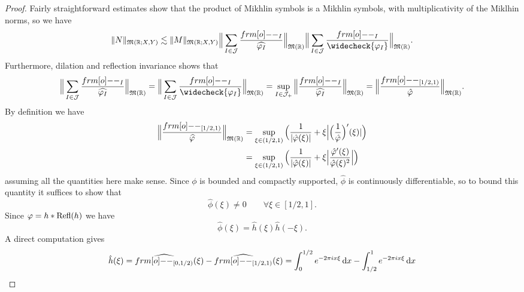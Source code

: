 \begin{proof}
  Fairly straightforward estimates show that the product of Mikhlin symbols is a Mikhlin symbols, with multiplicativity of the Miklhin norms, so we have
  \begin{equation*}
     \|N\|_{\mf{M}(\R;X,Y)} \lesssim \|M\|_{\mf{M}(\R;X,Y)} \Big\| \sum_{I \in \mc{J}} \frac{\1_{I} }{\widehat{\phi_{I}}} \Big\|_{\mf{M}(\R)} \Big\| \sum_{I \in \mc{J}} \frac{\1_{I} }{\widecheck{\phi_{I}}} \Big\|_{\mf{M}(\R)}.
   \end{equation*}
   Furthermore, dilation and reflection invariance shows that
   \begin{equation*}
     \Big\| \sum_{I \in \mc{J}} \frac{\1_{I} }{\widehat{\phi_{I}}} \Big\|_{\mf{M}(\R)}
     = \Big\| \sum_{I \in \mc{J}} \frac{\1_{I} }{\widecheck{\phi_{I}}} \Big\|_{\mf{M}(\R)}
     = \sup_{I \in \mc{J_{+}}} \Big\| \frac{\1_{I}}{\widehat{\phi_{I}}} \Big\|_{\mf{M}(\R)}
     = \Big\| \frac{\1_{[1/2,1)}}{\hat{\phi}} \Big\|_{\mf{M}(\R)}.
   \end{equation*}
   By definition we have
   \begin{equation*}
     \begin{aligned}
       \Big\| \frac{\1_{[1/2,1)}}{\widehat{\phi}} \Big\|_{\mf{M}(\R)}
       &= \sup_{\xi \in (1/2, 1)} \Big( \frac{1}{|\hat{\phi}(\xi)|}  + \xi\Big|\Big(\frac{1}{\hat{\phi}}\Big)'(\xi)| \Big) \\
       &= \sup_{\xi \in (1/2, 1)} \Big( \frac{1}{|\hat{\phi}(\xi)|}  + \xi\Big|\frac{\hat{\phi}'(\xi)}{\hat{\phi}(\xi)^2}\Big| \Big)
   \end{aligned}
   \end{equation*}
   assuming all the quantities here make sense.
   Since $\phi$ is bounded and compactly supported, $\hat{\phi}$ is continuously differentiable, so to bound this quantity it suffices to show that
   \begin{equation}\label{eq:phi-0}
     \hat{\phi}(\xi) \neq 0 \qquad \forall \xi \in [1/2, 1].
   \end{equation}
   Since $\varphi = h \ast \operatorname{Refl}(h)$ we have
   \begin{equation*}
     \hat{\phi}(\xi) = \hat{h}(\xi) \hat{h}(-\xi).
   \end{equation*}
   A direct computation gives
   \begin{equation*}
     \begin{aligned}
     \hat{h}(\xi) = \widehat{\1_{[0,1/2)}}(\xi) - \widehat{\1_{[1/2,1)}}(\xi)
     &= \int_{0}^{1/2} e^{-2\pi i x \xi} \, \dd x - \int_{1/2}^{1} e^{-2\pi i x \xi} \, \dd x \\

\end{aligned}
\end{equation*}
\end{proof}
